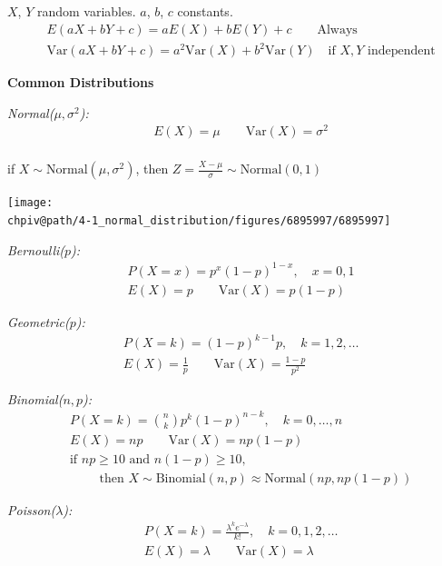 \documentclass[8pt]{article}
\makeatletter
\def\chpiv@path{../../Chp 4}
\makeatother
\begin{document}
\begin{multicols}{2}
$X$, $Y$ random variables. $a$, $b$, $c$ constants.
\begin{align*}
    &E(aX + bY + c) = aE(X) + bE(Y) + c \qquad \text{Always} \\
    &\mathrm{Var}(aX + bY +c) = a^2\mathrm{Var}(X) + b^2\mathrm{Var}(Y) \quad \text{if } X, Y \text{ independent}
\end{align*}

\textbf{Common Distributions}

\textit{Normal($\mu,\sigma^2$):}
\begin{align*}
    &E(X) = \mu \qquad \mathrm{Var}(X) = \sigma^2 \\
\end{align*}

\vspace{-2em}
if $X \sim \text{Normal}(\mu, \sigma^2)$, then $Z = \frac{X - \mu}{\sigma} \sim \text{Normal}(0,1)$

\begin{center}
\texttt{[image: \\chpiv@path/4-1\_normal\_distribution/figures/6895997/6895997]}
\end{center}

\textit{Bernoulli($p$):}
\begin{align*}
    &P(X = x) = p^x (1-p)^{1-x},\quad x=0,1 \\
    &E(X) = p \qquad \mathrm{Var}(X) = p(1-p)
\end{align*}

\textit{Geometric($p$):}
\begin{align*}
    &P(X = k) = (1-p)^{k-1}p,\quad k=1,2,\ldots \\
    &E(X) = \frac{1}{p} \qquad \mathrm{Var}(X) = \frac{1-p}{p^2}
\end{align*}

\textit{Binomial($n,p$):}
\begin{align*}
    &P(X = k) = \binom{n}{k}p^k(1-p)^{n-k},\quad k=0,\ldots,n \\
    &E(X) = np \qquad \mathrm{Var}(X) = np(1-p)\\
    &\text{if } np \ge 10 \text{ and } n(1-p) \ge 10, \\
    &\hspace{2em}\text{ then } X \sim \text{Binomial}(n,p) \approx \text{Normal}(np, np(1-p))
\end{align*}


\textit{Poisson($\lambda$):}
\begin{align*}
    &P(X = k) = \frac{\lambda^k e^{-\lambda}}{k!},\quad k=0,1,2,\ldots \\
    &E(X) = \lambda \qquad \mathrm{Var}(X) = \lambda
\end{align*}


\end{multicols} %
\end{document}

